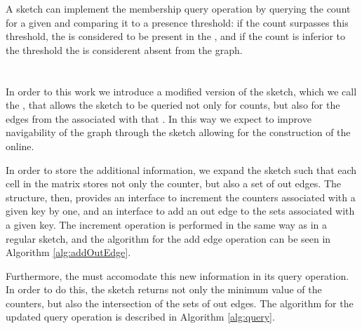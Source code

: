 
A \cm sketch can implement the membership query operation by querying the count for a given \kmer and comparing it to a presence threshold:
if the count surpasses this threshold, the \kmer is considered to be present in the \dBG, and if the count is inferior to the threshold the
\kmer is considerent absent from the graph.

\section{\dBCM}
\label{sec:debruijncountmin}


In order to this work we introduce a modified version of the \cm sketch, which we call the \dBCM, that allows the sketch to be queried not only
for \kmer counts, but also for the edges from the \dBG associated with that \kmer. In this way we expect to improve navigability of the
graph through the sketch allowing for the construction of the \dBG online.

In order to store the additional information, we expand the \cm sketch such that each cell in the matrix stores not only the counter,
but also a set of out edges. The structure, then, provides an interface to increment the counters associated with a given key by one,
and an interface to add an out edge to the sets associated with a given key. The increment operation is performed in the same way as in
a regular \cm sketch, and the algorithm for the add edge operation can be seen in Algorithm \ref{alg:addOutEdge}.

Furthermore, the \dBCM must accomodate this new information in its query operation. In order to do this, the sketch returns not only
the minimum value of the counters, but also the intersection of the sets of out edges. The algorithm for the updated query operation is
described in Algorithm \ref{alg:query}.

\begin{algorithm}[htbp]
    \caption{$\mathit{addOutEdge}(\text{k-mer}, \mathit{outEdge})$}\label{alg:addOutEdge}
\end{algorithm}

